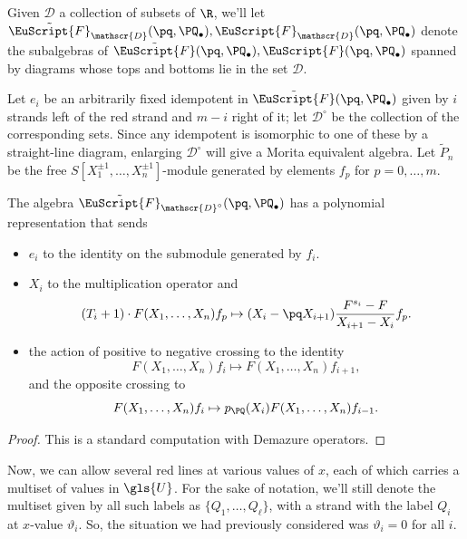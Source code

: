 Given ${\mathscr{D}}$ a collection of subsets of $\R$, we'll let $\tilde{\EuScript{F}}_{\mathscr{D}}
(\pq,\PQ_{\bullet}),{\EuScript{F}}_{\mathscr{D}} (\pq,\PQ_{\bullet})$
denote the subalgebras of $\tilde{\EuScript{F}}
(\pq,\PQ_{\bullet}),{\EuScript{F}} (\pq,\PQ_{\bullet})$ spanned by
diagrams whose tops and bottoms lie in the set ${\mathscr{D}}$.


 Let $e_i$ be an arbitrarily fixed idempotent in $\tilde{\EuScript{F}} (\pq,\PQ_{\bullet})$ given by
 $i$ strands left of the red strand and $m-i$ right of it; let
 $\mathscr{D}^\circ$ be the collection of the corresponding
 sets. Since any idempotent is isomorphic to one of these by a
 straight-line diagram, enlarging $\mathscr{D}^\circ$ will give a
 Morita equivalent algebra. Let
 $\tilde{P}_n$ be the free $S[X_1^{\pm 1},\dots, X_n^{\pm 1}]$-module generated
 by elements $f_p$ for $p=0,\dots, m$.
\begin{prop}\label{tilde-poly}
 The algebra $\tilde{\EuScript{F}}_{\mathscr{D}^\circ} (\pq,\PQ_{\bullet})$ has a polynomial
 representation that sends
 \begin{itemize}
\item $e_i$ to the identity on the submodule generated by $f_i$.
\item $X_i$ to the multiplication operator and \[(T_i+1)\cdot
 F(X_1,\dots,X_n)f_p\mapsto (X_i-\pq X_{i+1})\frac{F^{s_i}-F}{X_{i+1}-X_i}f_p.\]
 \item the action of positive to negative crossing to the identity
 \[F(X_1,\dots,X_n)f_i\mapsto
 F(X_1,\dots,X_n)f_{i+1},\] and the opposite crossing to
 \[F(X_1,\dots,X_n)f_i\mapsto
 p_\PQ(X_i)F(X_1,\dots,X_n)f_{i-1}.\]
 \end{itemize}
\end{prop}
\begin{proof}
 This is a standard computation with Demazure operators.
\end{proof}


Now, we can allow several red
lines at various values of $x$, each of which carries a multiset of
values in $\gls{U}$. For the sake of notation, we'll still denote the
multiset given by all such labels as $\{Q_1,\dots, Q_\ell\}$, with a strand with the label
$Q_{i}$ at $x$-value
$\vartheta_i$. So, the situation we had previously considered was
$\vartheta_i=0$ for all $i$.

